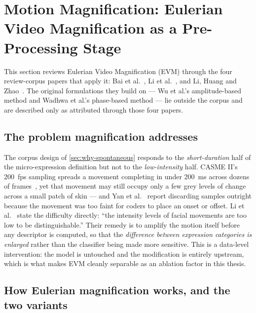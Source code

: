 \section{Motion Magnification: Eulerian Video Magnification as a Pre-Processing Stage}
\label{sec:evm-review}

This section reviews Eulerian Video Magnification (EVM) through the four review-corpus papers that apply it: Bai et al.~\cite{bai2021}, Li et al.~\cite{liX2018}, and Li, Huang and Zhao~\cite{liY2018,liY2021}. The original formulations they build on --- Wu et al.'s amplitude-based method and Wadhwa et al.'s phase-based method --- lie outside the corpus and are described only as attributed through those four papers.

\subsection{The problem magnification addresses}
\label{sec:evm-problem}

The corpus design of \autoref{sec:why-spontaneous} responds to the \textit{short-duration} half of the micro-expression definition but not to the \textit{low-intensity} half. CASME II's 200~fps sampling spreads a movement completing in under 200~ms across dozens of frames~\cite{yan2014}, yet that movement may still occupy only a few grey levels of change across a small patch of skin --- and Yan et al.~\cite{yan2014} report discarding samples outright because the movement was too faint for coders to place an onset or offset. Li et al.~\cite{liX2018} state the difficulty directly: ``the intensity levels of facial movements are too low to be distinguishable.'' Their remedy is to amplify the motion itself before any descriptor is computed, so that the \textit{difference between expression categories is enlarged} rather than the classifier being made more sensitive. This is a data-level intervention: the model is untouched and the modification is entirely upstream, which is what makes EVM cleanly separable as an ablation factor in this thesis.

\subsection{How Eulerian magnification works, and the two variants}
\label{sec:evm-how}

